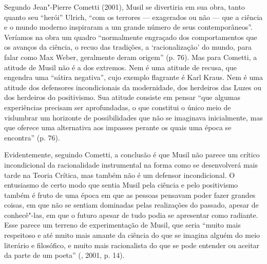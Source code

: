 Segundo Jean"-Pierre Cometti (2001), Musil se divertiria em sua obra,
tanto quanto seu ``herói'' Ulrich, ``com os terrores --- exagerados ou
não --- que a ciência e o mundo moderno inspiraram a um grande número de
seus contemporâneos''. Veríamos na obra um quadro ``normalmente
engraçado dos comportamentos que os avanços da ciência, o recuo das
tradições, a `racionalização' do mundo, para falar como Max Weber,
geralmente deram origem'' (p. 76). Mas para Cometti, a atitude de Musil
não é a dos extremos. Nem é uma atitude de recusa, que engendra uma
``sátira negativa'', cujo exemplo flagrante é Karl Kraus. Nem é uma
atitude dos defensores incondicionais da modernidade, dos herdeiros das
Luzes ou dos herdeiros do positivismo. Sua atitude consiste em pensar
``que algumas experiências precisam ser aprofundadas, o que constitui o
único meio de vislumbrar um horizonte de possibilidades que não se
imaginava inicialmente, mas que oferece uma alternativa aos impasses
perante os quais uma época se encontra'' (p. 76).

Evidentemente, seguindo Cometti, a conclusão é que Musil não
parece um crítico incondicional da racionalidade instrumental na forma
como se desenvolverá mais tarde na Teoria Crítica, mas também não é um
defensor incondicional. O entusiasmo de certo modo que sentia Musil pela
ciência e pelo positivismo também é fruto de uma época em que as pessoas
pensavam poder fazer grandes coisas, em que não se sentiam dominadas
pelas realizações do passado, apesar de conhecê"-las, em que o futuro
apesar de tudo podia se apresentar como radiante. Esse parece um terreno
de experimentação de Musil, que seria ``muito mais respeitoso e até
muito mais amante da ciência do que se imagina alguém do meio literário
e filosófico, e muito mais racionalista do que se pode entender ou
aceitar da parte de um poeta'' (, 2001, p. 14).

